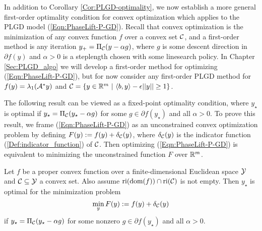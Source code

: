 



In addition to Corollary \ref{Cor:PLGD-optimality}, we now establish a more general first-order optimality condition for convex optimization which applies to the PLGD model (\ref{Eqn:PhaseLift-P-GD}).  
Recall that convex optimization is the minimization of any convex function $f$ over a convex set ${\mathcal C}$, and a first-order method is any iteration $y_+ = \Pi_{\mathcal C}(y - \alpha g)$, where $g$ is some descent direction in $\partial f(y)$ and $\alpha > 0$ is a steplength chosen with some linesearch policy.
In Chapter \ref{Sec:PLGD_algo} we will develop a first-order method for optimizing (\ref{Eqn:PhaseLift-P-GD}), but for now consider any first-order PLGD method for $f(y) = \lambda_1({\mathcal A}^*y)$ and ${\mathcal C} = \{ y \in \mathbb{R}^m \ | \ \langle b, y \rangle - \epsilon ||y|| \geq 1 \}$.




The following result can be viewed as a fixed-point optimality condition, where $y_\star$ is optimal if $y_\star = \Pi_{\mathcal C}(y_\star - \alpha g)$ for some $g \in \partial f(y_\star)$ and all $\alpha > 0$.  To prove this result, we frame (\ref{Eqn:PhaseLift-P-GD}) as an unconstrained convex optimization problem by defining $F(y) := f(y) + \delta_{\mathcal C}(y)$, where $\delta_{\mathcal C}(y)$ is the indicator function (\ref{Def:indicator_function}) of ${\mathcal C}$.  Then optimizing (\ref{Eqn:PhaseLift-P-GD}) is equivalent to minimizing the unconstrained function $F$ over ${\mathbb R}^m$.  

\begin{prop} 			\label{Prop:PLGD-opt_unconstrained}
Let $f$ be a proper convex function over a finite-dimensional Euclidean space ${\mathcal Y}$ and ${\mathcal C} \subseteq {\mathcal Y}$ a convex set.  Also assume $\textnormal{ri}( \textnormal{dom} (f)) \cap \textnormal{ri}({\mathcal C})$ is not empty.   Then $y_\star$ is optimal for the minimization problem
\begin{equation} 			\label{Eqn:subdiff_optimality_prop}
\min_{\substack{y}} F(y) := f(y) + \delta_{\mathcal C}(y)
\end{equation}
if $y_\star = \Pi_{\mathcal C}(y_\star - \alpha g)$ for some nonzero $g \in \partial f(y_\star)$ and all $\alpha >0$.
\end{prop}

